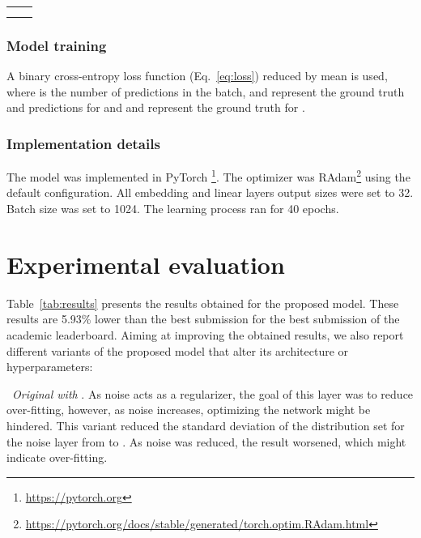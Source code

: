 \documentclass[manuscript,nonacm]{acmart}
\begin{document}
\begin{table}[H]
    \centering
   
\begin{tabular}{cc}

\multirow{2}{0.5\columnwidth}{   } 

&  \tabularnewline
& 

    \end{tabular}\vspace{-0.5cm}
   
\end{table}

\subsubsection*{\textbf{Model training}}\hfill 

A binary cross-entropy loss function (Eq.~\ref{eq:loss}) reduced by mean is used, where  is the number of predictions in the batch,  and  represent the ground truth and predictions for  and  and  represent the ground truth for .\vspace{-0.3cm}





\subsubsection*{\textbf{Implementation details}}\hfill 

The model was implemented in PyTorch \footnote{\url{https://pytorch.org}}. The optimizer was RAdam\footnote{\url{https://pytorch.org/docs/stable/generated/torch.optim.RAdam.html}} using the default configuration. All embedding and linear layers output sizes were set to 32. Batch size was set to 1024. The learning process ran for 40 epochs.

\section{Experimental evaluation}\label{sec:evaluation}

Table~\ref{tab:results} presents the results obtained for the proposed model. These results are 5.93\% lower than the best submission for the best submission of the academic leaderboard. Aiming at improving the obtained results, we also report different variants of the proposed model that alter its architecture or hyperparameters: 

\noindent\textbullet~\textit{Original with }. As noise acts as a regularizer, the goal of this layer was to reduce over-fitting, however, as noise increases, optimizing the network might be hindered. This variant reduced the standard deviation of the  distribution set for the noise layer from  to . As noise was reduced, the result worsened, which might indicate over-fitting.
\end{document}
